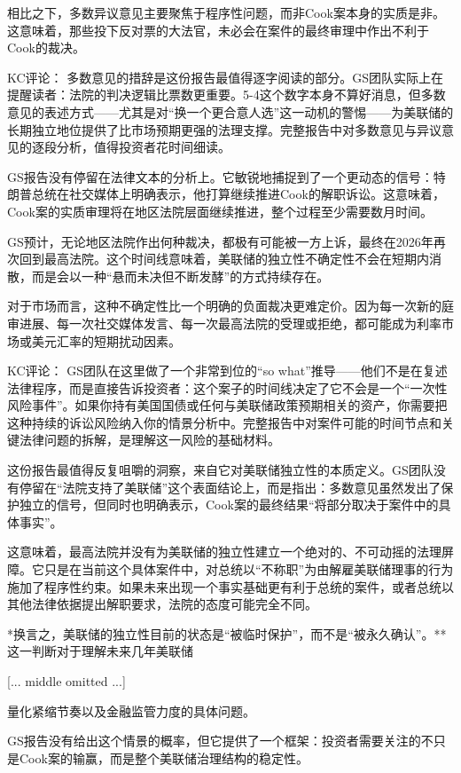 \documentclass[11pt]{ctexart}
\begin{document}
相比之下，多数异议意见主要聚焦于程序性问题，而非Cook案本身的实质是非。这意味着，那些投下反对票的大法官，未必会在案件的最终审理中作出不利于Cook的裁决。

KC评论： 多数意见的措辞是这份报告最值得逐字阅读的部分。GS团队实际上在提醒读者：法院的判决逻辑比票数更重要。5-4这个数字本身不算好消息，但多数意见的表述方式——尤其是对“换一个更合意人选”这一动机的警惕——为美联储的长期独立地位提供了比市场预期更强的法理支撑。完整报告中对多数意见与异议意见的逐段分析，值得投资者花时间细读。

GS报告没有停留在法律文本的分析上。它敏锐地捕捉到了一个更动态的信号：特朗普总统在社交媒体上明确表示，他打算继续推进Cook的解职诉讼。这意味着，Cook案的实质审理将在地区法院层面继续推进，整个过程至少需要数月时间。

GS预计，无论地区法院作出何种裁决，都极有可能被一方上诉，最终在2026年再次回到最高法院。这个时间线意味着，美联储的独立性不确定性不会在短期内消散，而是会以一种“悬而未决但不断发酵”的方式持续存在。

对于市场而言，这种不确定性比一个明确的负面裁决更难定价。因为每一次新的庭审进展、每一次社交媒体发言、每一次最高法院的受理或拒绝，都可能成为利率市场或美元汇率的短期扰动因素。

KC评论： GS团队在这里做了一个非常到位的“so what”推导——他们不是在复述法律程序，而是直接告诉投资者：这个案子的时间线决定了它不会是一个“一次性风险事件”。如果你持有美国国债或任何与美联储政策预期相关的资产，你需要把这种持续的诉讼风险纳入你的情景分析中。完整报告中对案件可能的时间节点和关键法律问题的拆解，是理解这一风险的基础材料。

这份报告最值得反复咀嚼的洞察，来自它对美联储独立性的本质定义。GS团队没有停留在“法院支持了美联储”这个表面结论上，而是指出：多数意见虽然发出了保护独立的信号，但同时也明确表示，Cook案的最终结果“将部分取决于案件中的具体事实”。

这意味着，最高法院并没有为美联储的独立性建立一个绝对的、不可动摇的法理屏障。它只是在当前这个具体案件中，对总统以“不称职”为由解雇美联储理事的行为施加了程序性约束。如果未来出现一个事实基础更有利于总统的案件，或者总统以其他法律依据提出解职要求，法院的态度可能完全不同。

*换言之，美联储的独立性目前的状态是“被临时保护”，而不是“被永久确认”。** 这一判断对于理解未来几年美联储

[... middle omitted ...]

量化紧缩节奏以及金融监管力度的具体问题。

GS报告没有给出这个情景的概率，但它提供了一个框架：投资者需要关注的不只是Cook案的输赢，而是整个美联储治理结构的稳定性。
\end{document}
